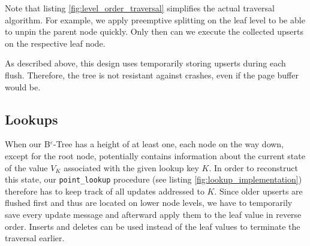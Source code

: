 Note that listing \ref{fig:level_order_traversal} simplifies the actual traversal algorithm. For example, we apply preemptive splitting on the leaf level to be able to unpin the parent node quickly. Only then can we execute the collected upserts on the respective leaf node.

As described above, this design uses temporarily storing upserts during each flush. Therefore, the tree is not resistant against crashes, even if the page buffer would be. 

\subsection{Lookups}\label{5.2.4}

When our B$^\varepsilon$-Tree has a height of at least one, each node on the way down, except for the root node, potentially contains information about the current state of the value $V_K$ associated with the given lookup key $K$. In order to reconstruct this state, our \texttt{point\_lookup} procedure (see listing \ref{fig:lookup_implementation}) therefore has to keep track of all updates addressed to $K$. Since older upserts are flushed first and thus are located on lower node levels, we have to temporarily save every update message and afterward apply them to the leaf value in reverse order. Inserts and deletes can be used instead of the leaf values to terminate the traversal earlier.

